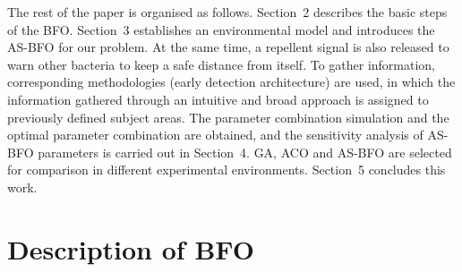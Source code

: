 \documentclass{PDS}%
\theoremstyle{definition}
\begin{document}
The rest of the paper is organised as follows. Section~2 describes the basic steps
of the BFO. Section~3 establishes an environmental model and introduces the AS-BFO for
our problem.  At the same time, a repellent signal is
also released to warn other bacteria to keep a safe distance from
itself.  To gather information, corresponding methodologies
(early detection architecture) are used, in which the information gathered through an
intuitive and broad approach is assigned to previously defined
subject areas. The parameter combination simulation and the optimal parameter combination
are obtained, and the sensitivity analysis of AS-BFO parameters is carried out in
Section~4. GA, ACO and AS-BFO are selected for comparison in different experimental
environments. Section~5 concludes this work.

\section{Description of BFO}\label{sec2}
\end{document}
